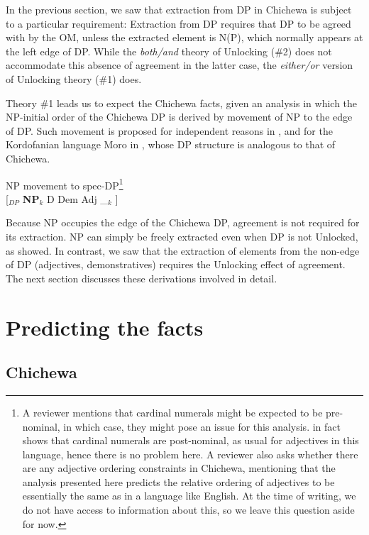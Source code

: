 \documentclass[output=paper,colorlinks,citecolor=brown]{langscibook}
\begin{document}
In the previous section, we saw that extraction from DP in Chichewa is subject to a particular requirement: Extraction from DP requires that DP to be agreed with by the OM, unless the extracted element is N(P), which normally appears at the left edge of DP. While the \emph{both/and} theory of Unlocking (\#2) does not accommodate this absence of agreement in the latter case, the \emph{either/or} version of Unlocking theory (\#1) does.

Theory \#1 leads us to expect the Chichewa facts, given an analysis in which the NP-initial order of the Chichewa DP is derived by movement of NP to the edge of DP. Such movement is proposed for independent reasons in \citet{Cinque2005}, and for the Kordofanian language Moro in \citet{Jenks2010}, whose DP structure is analogous to that of Chichewa.

\ea%
    \label{ex:branan:17}
    NP movement to spec-DP\footnote{A reviewer mentions that cardinal numerals might be expected to be pre-nominal, in which case, they might pose an issue for this analysis. \citet{Mchombo2004} in fact shows that cardinal numerals are post-nominal, as usual for adjectives in this language, hence there is no problem here. A reviewer also asks whether there are any adjective ordering constraints in Chichewa, mentioning that the analysis presented here predicts the relative ordering of adjectives to be essentially the same as in a language like English. At the time of writing, we do not have access to information about this, so we leave this question aside for now.}\\
    {[$_{DP}$} \textbf{NP}$_{k}$ D Dem Adj \_$_{k}$ ]
\z

Because NP occupies the edge of the Chichewa DP, agreement is not required for its extraction. NP can simply be freely extracted even when DP is not Unlocked, as  showed. In contrast, we saw that the extraction of elements from the non-edge of DP (adjectives, demonstratives) requires the Unlocking effect of agreement. The next section discusses these derivations involved in detail.

\section{Predicting the facts}\label{sec:branan:5}

\subsection{Chichewa}\label{sec:branan:5.1}
\end{document}
